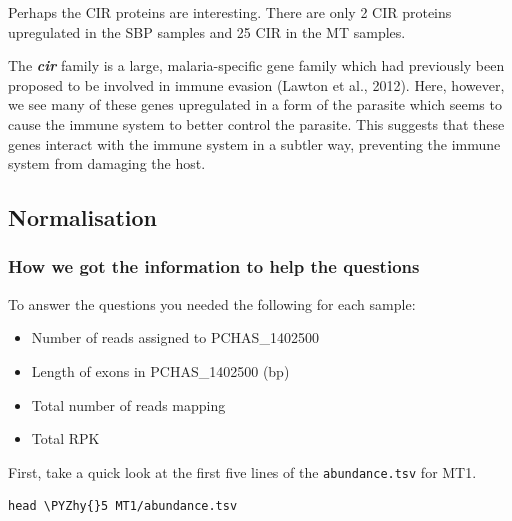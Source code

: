 \documentclass[11pt]{article}
\makeatletter
\providecommand{\tightlist}{%
      \setlength{\itemsep}{0pt}\setlength{\parskip}{0pt}}
\def\PYZhy{\char`\-}
\newcommand{\boxspacing}{\kern\kvtcb@left@rule\kern\kvtcb@boxsep}
\newcommand{\prompt}[4]{
        {\ttfamily\llap{{\color{#2}[#3]:\hspace{3pt}#4}}\vspace{-\baselineskip}}
    }
\makeatother
\begin{document}
    Perhaps the CIR proteins are interesting. There are only 2 CIR proteins
upregulated in the SBP samples and 25 CIR in the MT samples.

The \textbf{\textit{cir}} family is a large, malaria-specific gene family
which had previously been proposed to be involved in immune evasion
(Lawton et al., 2012). Here, however, we see many of these genes
upregulated in a form of the parasite which seems to cause the immune
system to better control the parasite. This suggests that these genes
interact with the immune system in a subtler way, preventing the immune
system from damaging the host.

\newpage

    \hypertarget{normalisation}{%
\subsection{Normalisation}\label{normalisation}}

\hypertarget{how-we-got-the-information-to-help-the-questions}{%
\subsubsection{How we got the information to help the
questions}\label{how-we-got-the-information-to-help-the-questions}}

To answer the questions you needed the following for each sample:

\begin{itemize}
\tightlist
\item
  Number of reads assigned to PCHAS\_1402500
\item
  Length of exons in PCHAS\_1402500 (bp)
\item
  Total number of reads mapping
\item
  Total RPK
\end{itemize}

First, take a quick look at the first five lines of the
\texttt{abundance.tsv} for MT1.

    \begin{tcolorbox}[breakable, size=fbox, boxrule=1pt, pad at break*=1mm,colback=cellbackground, colframe=cellborder]
\prompt{In}{incolor}{ }{\boxspacing}
\begin{Verbatim}[commandchars=\\\{\}]
head \PYZhy{}5 MT1/abundance.tsv
\end{Verbatim}
\end{tcolorbox}
\end{document}
